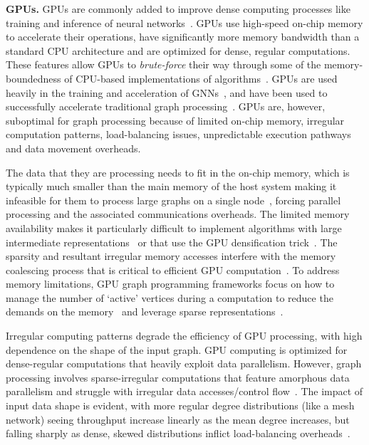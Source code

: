 \textbf{GPUs.}
GPUs are commonly added to improve dense computing processes like training and inference of neural networks~\cite{Dally2021}.
GPUs use high-speed on-chip memory to accelerate their operations, have significantly more memory bandwidth than a standard CPU architecture and are optimized for dense, regular computations. 
These features allow GPUs to \textit{brute-force} their way through some of the memory-boundedness of CPU-based implementations of algorithms~\cite{Aananthakrishnan2020}.
GPUs are used heavily in the training and acceleration of GNNs~\cite{Wu2021a, Baruah2021, Zhang2023}, and have been used to successfully accelerate traditional graph processing~\cite{Fu2014, Wang2016}.
GPUs are, however, suboptimal for graph processing because of limited on-chip memory, irregular computation patterns, load-balancing issues, unpredictable execution pathways and data movement overheads.

The data that they are processing needs to fit in the on-chip memory, which is typically much smaller than the main memory of the host system making it infeasible for them to process large graphs on a single node~\cite{Aananthakrishnan2020}, forcing parallel processing and the associated communications overheads. 
The limited memory availability makes it particularly difficult to implement algorithms with large intermediate representations~\cite{Sundaram2015} or that use the GPU densification trick~\cite{Aananthakrishnan2020}.  
The sparsity and resultant irregular memory accesses interfere with the memory coalescing process that is critical to efficient GPU computation~\cite{Aananthakrishnan2020}.
To address memory limitations, GPU graph programming frameworks focus on how to manage the number of `active' vertices during a computation to reduce the demands on the memory~\cite{Wang2016} and leverage sparse representations~\cite{Liu2014,Wu2015}.

Irregular computing patterns degrade the efficiency of GPU processing, with high dependence on the shape of the input graph. 
GPU computing is optimized for dense-regular computations that heavily exploit data parallelism. 
However, graph processing involves sparse-irregular computations that feature amorphous data parallelism and struggle with irregular data accesses/control flow~\cite{Wang2016}.
The impact of input data shape is evident, with more regular degree distributions (like a mesh network) seeing throughput increase linearly as the mean degree increases, but falling sharply as dense, skewed distributions inflict load-balancing overheads~\cite{Wu2015}.

